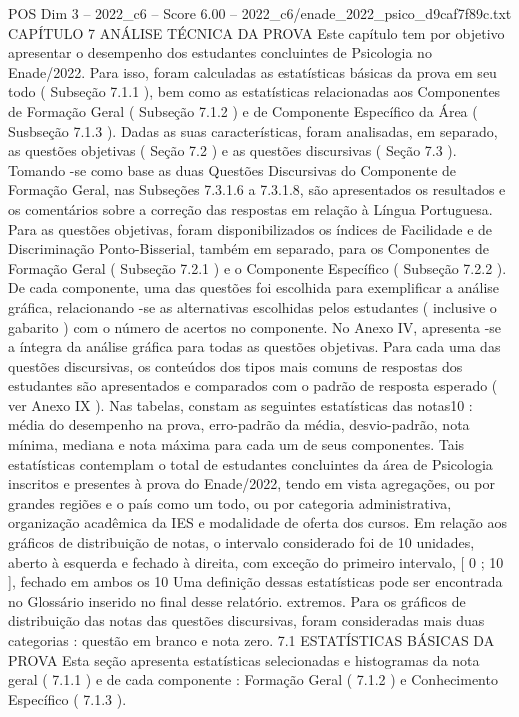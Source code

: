 \begin{textsample}{POS Dim 3 – 2022\_c6 – Score 6.00 – 2022\_c6/enade\_2022\_psico\_d9caf7f89c.txt}  \label{ex:f3_pos_030}
CAPÍTULO 7 ANÁLISE TÉCNICA DA PROVA Este capítulo tem por objetivo apresentar o desempenho dos estudantes concluintes de Psicologia no Enade/2022.
Para isso, foram calculadas as estatísticas básicas da prova em seu todo ( Subseção 7.1.1 ), bem como as estatísticas relacionadas aos Componentes de Formação Geral ( Subseção 7.1.2 ) e de Componente Específico da Área ( Susbseção 7.1.3 ).
Dadas as suas características, foram analisadas, em separado, as questões objetivas ( Seção 7.2 ) e as questões discursivas ( Seção 7.3 ).
Tomando -se como base as duas Questões Discursivas do Componente de Formação Geral, nas Subseções 7.3.1.6 a 7.3.1.8, são apresentados os resultados e os comentários sobre a correção das respostas em relação à Língua Portuguesa.
Para as questões objetivas, foram disponibilizados os índices de Facilidade e de Discriminação Ponto-Bisserial, também em separado, para os Componentes de Formação Geral ( Subseção 7.2.1 ) e o Componente Específico ( Subseção 7.2.2 ).
De cada componente, uma das questões foi escolhida para exemplificar a análise gráfica, relacionando -se as alternativas escolhidas pelos estudantes ( inclusive o gabarito ) com o número de acertos no componente.
No Anexo IV, apresenta -se a íntegra da análise gráfica para todas as questões objetivas.
Para cada uma das questões discursivas, os conteúdos dos tipos mais comuns de respostas dos estudantes são apresentados e comparados com o padrão de resposta esperado ( ver Anexo IX ).
Nas tabelas, constam as seguintes estatísticas das notas10 : média do desempenho na prova, erro-padrão da média, desvio-padrão, nota mínima, mediana e nota máxima para cada um de seus componentes.
Tais estatísticas contemplam o total de estudantes concluintes da área de Psicologia inscritos e presentes à prova do Enade/2022, tendo em vista agregações, ou por grandes regiões e o país como um todo, ou por categoria administrativa, organização acadêmica da IES e modalidade de oferta dos cursos.
Em relação aos gráficos de distribuição de notas, o intervalo considerado foi de 10 unidades, aberto à esquerda e fechado à direita, com exceção do primeiro intervalo, [ 0 ; 10 ], fechado em ambos os 10 Uma definição dessas estatísticas pode ser encontrada no Glossário inserido no final desse relatório. extremos.
Para os gráficos de distribuição das notas das questões discursivas, foram consideradas mais duas categorias : questão em branco e nota zero. 7.1 ESTATÍSTICAS BÁSICAS DA PROVA Esta seção apresenta estatísticas selecionadas e histogramas da nota geral ( 7.1.1 ) e de cada componente : Formação Geral ( 7.1.2 ) e Conhecimento Específico ( 7.1.3 ).

\end{textsample}
